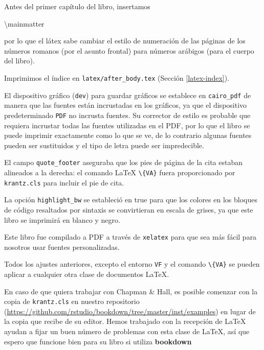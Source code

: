 \documentclass[12pt,]{krantz}
\makeatletter
\newenvironment{Shaded}{\begin{snugshade}}{\end{snugshade}}
\newcommand{\FunctionTok}[1]{\textcolor[rgb]{0.00,0.00,0.00}{#1}}
\newenvironment{kframe}{%
\medskip{}
\setlength{\fboxsep}{.8em}
 \def\at@end@of@kframe{}%
 \ifinner\ifhmode%
  \def\at@end@of@kframe{\end{minipage}}%
  \begin{minipage}{\columnwidth}%
 \fi\fi%
 \def\FrameCommand##1{\hskip\@totalleftmargin \hskip-\fboxsep
 \colorbox{shadecolor}{##1}\hskip-\fboxsep
     \hskip-\linewidth \hskip-\@totalleftmargin \hskip\columnwidth}%
 \MakeFramed {\advance\hsize-\width
   \@totalleftmargin\z@ \linewidth\hsize
   \@setminipage}}%
 {\par\unskip\endMakeFramed%
 \at@end@of@kframe}
\renewenvironment{Shaded}{\begin{kframe}}{\end{kframe}}
\theoremstyle{definition}
\theoremstyle{definition}
\theoremstyle{definition}
\theoremstyle{remark}
\makeatother
\begin{document}
Antes del primer capítulo del libro, insertamos

\begin{Shaded}
\begin{Highlighting}[]
\FunctionTok{\textbackslash{}mainmatter}
\end{Highlighting}
\end{Shaded}

por lo que el látex sabe cambiar el estilo de numeración de las páginas
de los números romanos (por el asunto frontal) para números arábigos
(para el cuerpo del libro).

Imprimimos el índice en \texttt{latex/after\_body.tex} (Sección
\ref{latex-index}).

El dispositivo gráfico (\texttt{dev}) para guardar gráficos se establece
en \texttt{cairo\_pdf} de manera que las fuentes están incrustadas en
los gráficos, ya que el dispositivo predeterminado \texttt{PDF} no
incrusta fuentes. Su corrector de estilo es probable que requiera
incrustar todas las fuentes utilizadas en el PDF, por lo que el libro se
puede imprimir exactamente como lo que se ve, de lo contrario algunas
fuentes pueden ser sustituidos y el tipo de letra puede ser
impredecible.

El campo \texttt{quote\_footer} aseguraba que los pies de página de la
cita estaban alineados a la derecha: el comando LaTeX
\texttt{\textbackslash{}\{VA\}} fuera proporcionado por
\texttt{krantz.cls} para incluir el pie de cita.

La opción \texttt{highlight\_bw} se estableció en true para que los
colores en los bloques de código resaltados por sintaxis se convirtieran
en escala de grises, ya que este libro se imprimirá en blanco y negro.

Este libro fue compilado a PDF a través de \texttt{xelatex} para que sea
más fácil para nosotros usar fuentes personalizadas.

Todos los ajustes anteriores, excepto el entorno \texttt{VF} y el
comando \texttt{\textbackslash{}\{VA\}} se pueden aplicar a cualquier
otra clase de documentos LaTeX.

En caso de que quiera trabajar con Chapman \& Hall, es posible comenzar
con la copia de \texttt{krantz.cls} en nuestro repositorio
(\url{https://github.com/rstudio/bookdown/tree/master/inst/examples}) en
lugar de la copia que recibe de su editor. Hemos trabajado con la
recepción de LaTeX ayudan a fijar un buen número de problemas con esta
clase de LaTeX, así que espero que funcione bien para su libro si
utiliza \textbf{bookdown}
\end{document}

